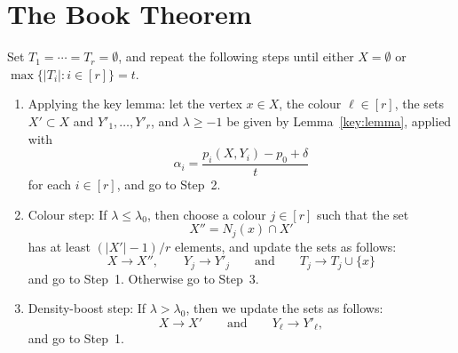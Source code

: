 
\section{The Book Theorem}


\begin{algorithm}\label{alg:book}
  Set $T_1 = \cdots = T_r = \emptyset$, and repeat the following steps until either $X = \emptyset$ or $\max\big\{ |T_i| : i \in [r] \big\} = t$. 
  \begin{enumerate}
  \item\label{Alg:Step1} Applying the key lemma: let the vertex $x \in X$, the colour $\ell \in [r]$, the sets $X' \subset X$ and $Y'_1,\ldots,Y'_r$, and $\lambda \ge -1$ be given by Lemma~\ref{key:lemma}, applied with
  \begin{equation}\label{def:alpha}
  \alpha_i = \frac{p_i(X,Y_i) - p_0 + \delta}{t}
  \end{equation}
  for each $i \in [r]$, and go to Step~2.\smallskip
  \item\label{Alg:Step2} Colour step: If $\lambda \le \lambda_0$, then choose a colour $j \in [r]$ such that the set
  $$X'' = N_j(x) \cap X'$$ 
  has at least $(|X'| - 1)/r$ elements, and update the sets as follows:
  $$X \to X'', \qquad Y_j \to Y'_j \qquad \text{and} \qquad T_j \to T_j \cup \{x\}$$
  and go to Step~1. Otherwise go to Step~3.\smallskip
  \item\label{Alg:Step3} Density-boost step: If $\lambda > \lambda_0$, then we update the sets as follows:
  $$X \to X' \qquad \text{and} \qquad Y_\ell \to Y'_\ell,$$
  and go to Step~1.
  \end{enumerate}  
\end{algorithm} 



